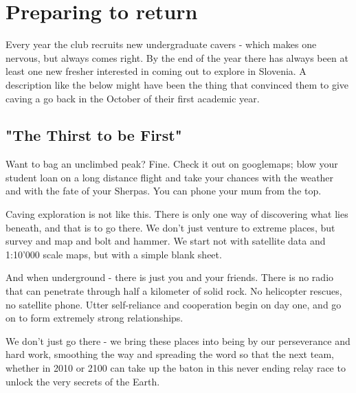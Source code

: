 \section{Preparing to return}
Every year the club recruits new undergraduate cavers - which makes one nervous, but always comes right. By the end of the year there has always been at least one new fresher interested in coming out to explore in Slovenia. A description like the below might have been the thing that convinced them to give caving a go back in the October of their first academic year.




\subsection{"The Thirst to be First"}

Want to bag an unclimbed peak? Fine. Check it out on googlemaps; blow your student loan on a long distance flight and take your chances with the weather and with the fate of your Sherpas. You can phone your mum from the top.

Caving exploration is not like this. There is only one way of discovering what lies beneath, and that is to go there. We don't just venture to extreme places, but survey and map and bolt and hammer. We start not with satellite data and 1:10'000 scale maps, but with a simple blank sheet.

And when underground - there is just you and your friends. There is no radio that can penetrate through half a kilometer of solid rock. No helicopter rescues, no satellite phone. Utter self-reliance and cooperation begin on day one, and go on to form extremely strong relationships.

We don't just go there - we bring these places into being by our perseverance and hard work, smoothing the way and spreading the word so that the next team, whether in 2010 or 2100 can take up the baton in this never ending relay race to unlock the very secrets of the Earth.

